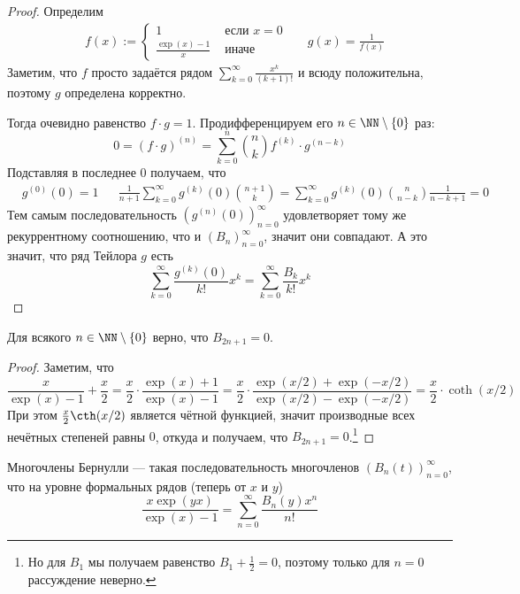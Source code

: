 \documentclass[12pt,a4paper]{article}
\begin{document}
    \begin{proof}
        Определим
        \begin{align*}
            &f(x) := \begin{cases}
                1& \text{ если $x = 0$}\\
                \frac{\exp(x) - 1}{x}& \text{ иначе}
            \end{cases}&
            &g(x) = \frac{1}{f(x)}
        \end{align*}
        Заметим, что $f$ просто задаётся рядом $\sum_{k=0}^\infty \frac{x^k}{(k+1)!}$ и всюду положительна, поэтому $g$ определена корректно.

        Тогда очевидно равенство $f \cdot g = 1$. Продифференцируем его $n \in \NN \setminus \{0\}$ раз:
        \[0 = (f \cdot g)^{(n)} = \sum_{k=0}^n \binom{n}{k} f^{(k)} \cdot g^{(n-k)}\]
        Подставляя в последнее $0$ получаем, что
        \begin{align*}
            &g^{(0)}(0) = 1&
            &\frac{1}{n+1}\sum_{k=0}^\infty g^{(k)}(0) \binom{n+1}{k} = \sum_{k=0}^\infty g^{(k)}(0) \binom{n}{n-k} \frac{1}{n-k+1} = 0
        \end{align*}
        Тем самым последовательность $(g^{(n)}(0))_{n=0}^\infty$ удовлетворяет тому же рекуррентному соотношению, что и $(B_n)_{n=0}^\infty$, значит они совпадают. А это значит, что ряд Тейлора $g$ есть
        \[\sum_{k=0}^\infty \frac{g^{(k)}(0)}{k!} x^k = \sum_{k=0}^\infty \frac{B_k}{k!} x^k\]
    \end{proof}

    \begin{lemma}
        Для всякого $n \in \NN \setminus \{0\}$ верно, что $B_{2n+1} = 0$.
    \end{lemma}

    \begin{proof}
        Заметим, что
        \[\frac{x}{\exp(x) - 1} + \frac{x}{2} = \frac{x}{2} \cdot \frac{\exp(x) + 1}{\exp(x) - 1} = \frac{x}{2} \cdot \frac{\exp(x/2) + \exp(-x/2)}{\exp(x/2) - \exp(-x/2)} = \frac{x}{2} \cdot \coth(x/2)\]
        При этом $\frac{x}{2}\cth(x/2)$ является чётной функцией, значит производные всех нечётных степеней равны $0$, откуда и получаем, что $B_{2n+1} = 0$.\footnote{Но для $B_1$ мы получаем равенство $B_1 + \frac{1}{2} = 0$, поэтому только для $n=0$ рассуждение неверно.}
    \end{proof}

    \begin{definition}
        Многочлены Бернулли --- такая последовательность многочленов $(B_n(t))_{n=0}^\infty$, что на уровне формальных рядов (теперь от $x$ и $y$)
        \[\frac{x \exp(yx)}{\exp(x) - 1} = \sum_{n=0}^\infty \frac{B_n(y) x^n}{n!}\]
    \end{definition}
\end{document}
